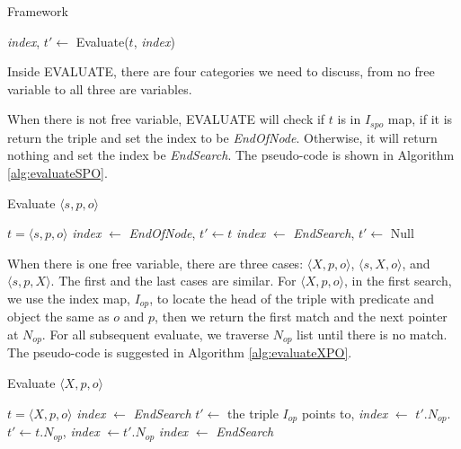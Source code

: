 \documentclass{article}
\begin{document}
\begin{enumerate}
\begin{enumerate}
\begin{algorithm}[H]
\caption{Framework}\label{alg:evaluate}
\begin{algorithmic}

\State \textit{index}, $t' \leftarrow$ Evaluate($t$, \textit{index})
\EndWhile

\end{algorithmic}
\end{algorithm}

Inside EVALUATE, there are four categories we need to discuss, from no free variable to all three are variables. 

When there is not free variable, EVALUATE will check if $t$ is in $I_{spo}$ map, if it is return the triple and set the index to be \textit{EndOfNode}. Otherwise, it will return nothing and set the index be \textit{EndSearch}. The pseudo-code is shown in Algorithm \eqref{alg:evaluateSPO}. 

\begin{algorithm}[H]
\caption{Evaluate $\langle s, p, o\rangle$}\label{alg:evaluateSPO}
\begin{algorithmic}
\Require $t = \langle s, p, o\rangle$
\State \textit{index} $\leftarrow$ \textit{EndOfNode}, $t'\leftarrow t$
\Else
\State \textit{index} $\leftarrow$ \textit{EndSearch}, $t'\leftarrow$ Null
\EndIf
\end{algorithmic}
\end{algorithm}

When there is one free variable, there are three cases: $\langle X, p, o\rangle$, $\langle s, X, o\rangle$, and $\langle s, p, X\rangle$. The first and the last cases are similar. For $\langle X, p, o\rangle$, in the first search, we use the index map, $I_{op}$, to locate the head of the triple with predicate and object the same as $o$ and $p$, then we return the first match and the next pointer at $N_{op}$. For all subsequent evaluate, we traverse $N_{op}$ list until there is no match. The pseudo-code is suggested in Algorithm \eqref{alg:evaluateXPO}.
 
\begin{algorithm}[H]
\caption{Evaluate $\langle X, p, o\rangle$}\label{alg:evaluateXPO}
\begin{algorithmic}
\Require $t = \langle X, p, o\rangle$
\State \textit{index} $\leftarrow$ \textit{EndSearch}
\EndIf
{} 
\State $t'\leftarrow$ the triple $I_{op}$ points to, \textit{index} $\leftarrow$ $t'.N_{op}$.
\Else{}
\State $t'\leftarrow t.N_{op}$, \textit{index} $\leftarrow t'.N_{op}$
\EndIf
{}
\State \textit{index} $\leftarrow$ \textit{EndSearch}
\EndIf
\end{algorithmic}
\end{algorithm}


\end{enumerate}
\end{enumerate}
\end{document}
